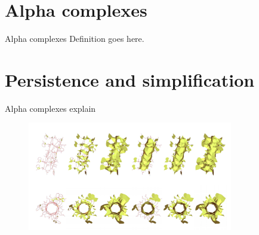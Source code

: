 \documentclass[10pt, compress]{beamer}
\begin{document}
\section{Alpha complexes}
\begin{frame}{Alpha complexes}
    Definition goes here.
\end{frame}
\section{Persistence and simplification}
\begin{frame}{Alpha complexes}
    explain
    \begin{figure}
        \centering
        \includegraphics[width=0.8\textwidth]{fig/simplification.png}
    \end{figure}
\end{frame}
\end{document}
